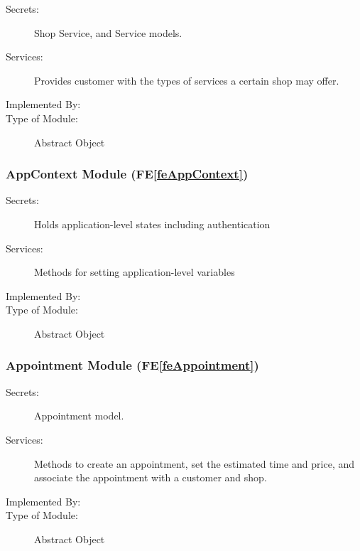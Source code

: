 \documentclass[12pt, titlepage]{article}
\newcommand{\feref}[1]{FE\ref{#1}}
\newcommand{\labelfedef}[1]{\label{fe#1def}}
\begin{document}
\begin{description}
\item[Secrets:] Shop Service, and Service models.
\item[Services:] Provides customer with the types of services a certain shop may offer.
\item[Implemented By:] \progname
\item[Type of Module:] Abstract Object
\end{description}

\subsubsection{AppContext Module (\feref{feAppContext}) \labelfedef{AppContext}}
\begin{description}
\item[Secrets:]Holds application-level states including authentication
\item[Services:]Methods for setting application-level variables
\item[Implemented By:] \progname
\item[Type of Module:] Abstract Object
\end{description}

\subsubsection{Appointment Module (\feref{feAppointment}) \labelfedef{Appointment}}

\begin{description}
\item[Secrets:] Appointment model.
\item[Services:] Methods to create an appointment, set the estimated time and price, and associate the appointment with a customer and shop.  
\item[Implemented By:] \progname
\item[Type of Module:] Abstract Object
\end{description}



\end{document}
